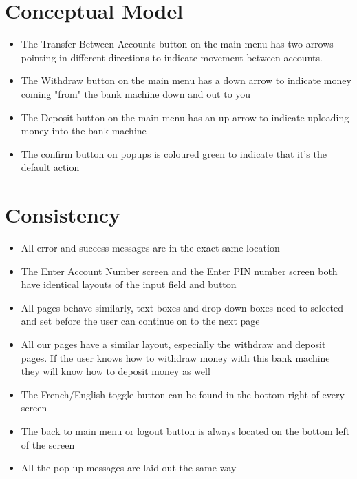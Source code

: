 \documentclass[10pt]{article}
\begin{document}
\section*{Conceptual Model} %
\begin{itemize}
\item The Transfer Between Accounts button on the main menu has two arrows pointing in different directions to indicate movement between accounts.
\item The Withdraw button on the main menu has a down arrow to indicate money coming "from" the bank machine down and out to you
\item The Deposit button on the main menu has an up arrow to indicate uploading money into the bank machine
\item The confirm button on popups is coloured green to indicate that it's the default action\\
\end{itemize}

\section*{Consistency} %
\begin{itemize}
\item All error and success messages are in the exact same location
\item The Enter Account Number screen and the Enter PIN number screen both have identical layouts of the input field and button
\item All pages behave similarly, text boxes and drop down boxes need to selected and set before the user can continue on to the next page
\item All our pages have a similar layout, especially the withdraw and deposit pages. If the user knows how to withdraw money with this bank machine they will know how to deposit money as well
\item The French/English toggle button can be found in the bottom right of every screen
\item The back to main menu or logout button is always located on the bottom left of the screen
\item All the pop up messages are laid out the same way\\
\end{itemize}
\end{document}
